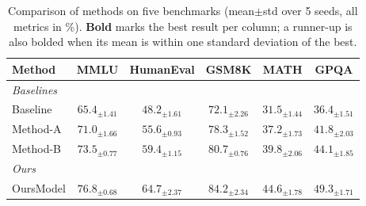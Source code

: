 \documentclass[10pt]{article}
\begin{document}
\begin{table}[h]
\centering
\begin{tabular}{lccccc}
\toprule
Method & MMLU & HumanEval & GSM8K & MATH & GPQA \\
\midrule
\multicolumn{6}{l}{\textit{Baselines}} \\
Baseline & $65.4_{\pm 1.41}$ & $48.2_{\pm 1.61}$ & $72.1_{\pm 2.26}$ & $31.5_{\pm 1.44}$ & $36.4_{\pm 1.51}$ \\
Method-A & $71.0_{\pm 1.66}$ & $55.6_{\pm 0.93}$ & $78.3_{\pm 1.52}$ & $37.2_{\pm 1.73}$ & $41.8_{\pm 2.03}$ \\
Method-B & $73.5_{\pm 0.77}$ & $59.4_{\pm 1.15}$ & $80.7_{\pm 0.76}$ & $39.8_{\pm 2.06}$ & $44.1_{\pm 1.85}$ \\
\midrule
\multicolumn{6}{l}{\textit{Ours}} \\
OursModel & \textbf{$76.8_{\pm 0.68}$} & \textbf{$64.7_{\pm 2.37}$} & \textbf{$84.2_{\pm 2.34}$} & \textbf{$44.6_{\pm 1.78}$} & \textbf{$49.3_{\pm 1.71}$} \\
\bottomrule
\end{tabular}
\caption{Comparison of methods on five benchmarks (mean$\pm$std over 5 seeds, all metrics in \%). \textbf{Bold} marks the best result per column; a runner-up is also bolded when its mean is within one standard deviation of the best.}
\end{table}
\end{document}

